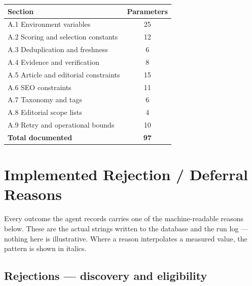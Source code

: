 \documentclass[11pt,a4paper]{article}
\begin{document}
\begin{center}
\small
\begin{tabularx}{\textwidth}{@{}>{\RaggedRight}X c@{}}
\toprule
\textbf{Section} & \textbf{Parameters} \\
\midrule
A.1 Environment variables & 25 \\
A.2 Scoring and selection constants & 12 \\
A.3 Deduplication and freshness & 6 \\
A.4 Evidence and verification & 8 \\
A.5 Article and editorial constraints & 15 \\
A.6 SEO constraints & 11 \\
A.7 Taxonomy and tags & 6 \\
A.8 Editorial scope lists & 4 \\
A.9 Retry and operational bounds & 10 \\
\midrule
\textbf{Total documented} & \textbf{97} \\
\bottomrule
\end{tabularx}
\end{center}

\clearpage
\section{Implemented Rejection / Deferral Reasons}
\label{app:reasons}

Every outcome the agent records carries one of the machine-readable reasons below.
These are the actual strings written to the database and the run log --- nothing
here is illustrative. Where a reason interpolates a measured value, the pattern is
shown in italics.

\subsection{Rejections --- discovery and eligibility}
\end{document}
